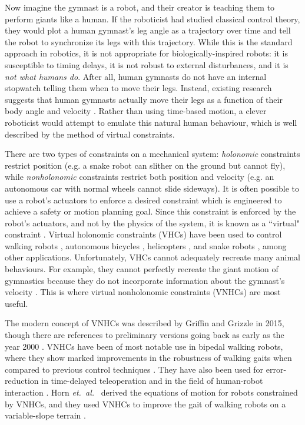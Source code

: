 \documentclass[a4paper,12pt]{article}
\begin{document}
Now imagine the gymnast is a robot, and their creator is teaching them to
perform giants like a human.
If the roboticist had studied classical control theory, they would plot a human
gymnast's leg angle as a trajectory over time and tell the robot to synchronize
its legs with this trajectory.
While this is the standard approach in robotics, it is not appropriate for
biologically-inspired robots: it is susceptible to timing delays, it is not
robust to external disturbances, and it is \textit{not what humans do}.
After all, human gymnasts do not have an internal stopwatch telling them when to
move their legs.
Instead, existing research suggests that human gymnasts actually move their legs
as a function of their body angle and velocity
\cite{pendulum_length_giant_gymnastics}. 
Rather than using time-based motion, a clever roboticist would attempt to
emulate this natural human behaviour, which is well described by the method
of virtual constraints.

There are two types of constraints on a mechanical system:
\textit{holonomic} constraints restrict position (e.g. a snake robot can slither
on the ground but cannot fly),
while \textit{nonholonomic} constraints restrict both position and
velocity (e.g. an autonomous car with normal wheels cannot slide sideways).
It is often possible to use a robot's actuators to enforce a desired constraint
which is engineered to achieve a safety or motion planning goal.
Since this constraint is enforced by the robot's actuators, and not by the
physics of the system, it is known as a ``virtual" constraint
\cite{vhcs_for_el_systems}.
Virtual holonomic constraints (VHCs) have been used to control walking robots
\cite{stable_walking}, autonomous bicycles \cite{bicycle},
helicopters \cite{helicopter}, and snake robots \cite{snake_robot},
among other applications.
Unfortunately, VHCs cannot adequately recreate many animal behaviours.
For example, they cannot perfectly recreate the giant motion of gymnastics 
because they do not incorporate information about the gymnast's velocity
\cite{xingbo_thesis}.
This is where virtual nonholonomic constraints (VNHCs) are most useful.

The modern concept of VNHCs was described by
Griffin and Grizzle \cite{nhvc_dynamic_walking} in 2015, though there are
references to preliminary versions going back as early as the year 2000
\cite{vnhc_human_robot_coop}.
VNHCs have been of most notable use in bipedal walking robots,
where they show marked improvements in the robustness of walking gaits
when compared to previous control techniques
\cite{nhvc_gait_optimization,output_nhvc_bipedal_control}.
They have also been used for error-reduction in time-delayed teleoperation
\cite{vnhc_time_delay_teleop} and in the field of human-robot interaction
\cite{psd_based_vnhc_redundant_manipulator,haptic_vnhc}.
Horn \textit{et.~al.}~\cite{hybrid_zero_dynamics_bipedal_nhvcs} derived the 
equations of motion for robots constrained by VNHCs, and they used VNHCs to
improve the gait of walking robots on a variable-slope terrain
\cite{nhvc_incline_walking}.
\end{document}
